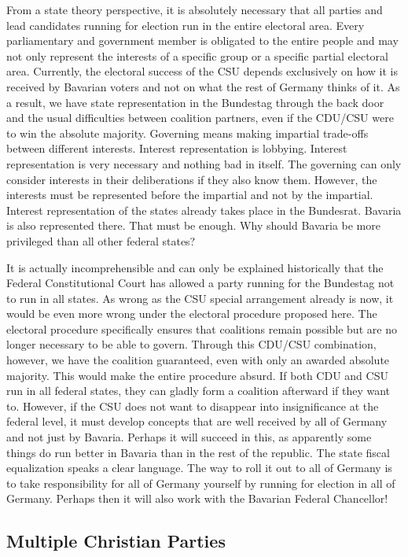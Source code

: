 From a state theory perspective, it is absolutely necessary that all parties and lead candidates running for election
run in the entire electoral area. Every parliamentary and
government member is obligated to the entire people and may not only represent the interests of a
specific group or a specific partial electoral area. Currently, the electoral success
of the CSU depends exclusively on how it is received by Bavarian voters and not on what the
rest of Germany thinks of it. As a result, we have state representation in the Bundestag through the back door
and the usual difficulties between coalition partners,
even if the CDU/CSU were to win the absolute majority. Governing means making impartial
trade-offs between different interests. Interest representation is lobbying.
Interest representation is very necessary and nothing bad in itself. The governing
can only consider interests in their deliberations if they also know them. However, the
interests must be represented before the impartial and not by the impartial.
Interest representation of the states already takes place in the Bundesrat. Bavaria is also
represented there. That must be enough. Why should Bavaria be more privileged than all other
federal states?

It is actually incomprehensible and can only be explained historically that the Federal Constitutional Court
has allowed a party running for the Bundestag not to run in all states.
As wrong as the CSU special arrangement already is now, it would be even more wrong under the
electoral procedure proposed here. The electoral procedure specifically ensures that coalitions remain
possible but are no longer necessary to be able to govern. Through this CDU/CSU combination, however, we have the coalition guaranteed, even with only an awarded absolute
majority. This would make the entire procedure absurd. If both CDU and CSU run in
all federal states, they can gladly form a coalition afterward if they want to. However, if the
CSU does not want to disappear into insignificance at the federal level, it must develop
concepts that are well received by all of Germany and not just by Bavaria.
Perhaps it will succeed in this, as apparently some things do run better in Bavaria than
in the rest of the republic. The state fiscal equalization speaks a clear language. The way to
roll it out to all of Germany is to take responsibility for all of Germany yourself by
running for election in all of Germany. Perhaps then it will also work with the Bavarian
Federal Chancellor!

\clearpage
\subsection{Multiple Christian Parties}

